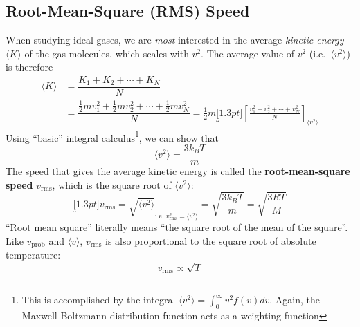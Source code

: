 \subsection{Root-Mean-Square (RMS) Speed}
When studying ideal gases, we are \emph{most} interested in the average
\emph{kinetic energy} $\langle K\rangle$ of the gas molecules, which scales
with $v^2$. The average value of $v^2$ (i.e.\ $\langle v^2\rangle$) is therefore
\begin{align*}
  \langle K\rangle &=\dfrac{K_1+K_2+\cdots+K_N}N\\
  &=\dfrac{\frac12mv_1^2+\frac12mv_2^2+\cdots+\frac12mv_N^2}N
  =\frac12m
  \underbracket[1.3pt]{
    \left[\frac{v_1^2+v_2^2+\cdots+v_N^2}N\right]
  }_{\langle v^2\rangle}
\end{align*}
Using ``basic'' integral calculus\footnote{This is accomplished by the integral
$\langle v^2\rangle=\int_0^\infty v^2f(v)dv$. Again, the Maxwell-Boltzmann
distribution function acts as a weighting function}, we can show that
\begin{equation}
    \langle v^2\rangle=\frac{3k_BT}m
\end{equation}
The speed that gives the average kinetic energy is called the
\textbf{root-mean-square speed} $v_\text{rms}$, which is the square root of
$\langle v^2\rangle$:
\begin{equation}
  \underbracket[1.3pt]{v_\text{rms}=\sqrt{\langle v^2\rangle}}_{
    \text{i.e.\ }v_\text{rms}^2=\langle v^2\rangle}
  =\sqrt{\frac{3k_BT}m}=\sqrt{\frac{3RT}M}
\end{equation}
``Root mean square'' literally means ``the square root of the mean of the
square''. Like $v_\text{prob}$ and $\langle v\rangle$, $v_\text{rms}$ is
also proportional to the square root of absolute temperature:
\begin{equation}
  v_\text{rms}\propto\sqrt T
\end{equation}
%
%
%
%
%  


